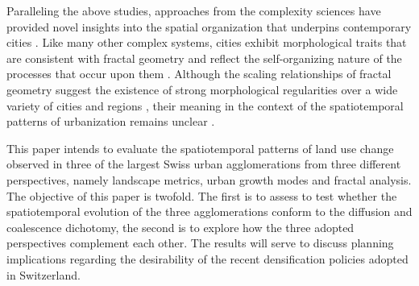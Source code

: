 \documentclass[10pt,letterpaper]{article}
\begin{document}
Paralleling the above studies, approaches from the complexity sciences have provided novel insights into the spatial organization that underpins contemporary cities \cite{batty2005cities}.
Like many other complex systems, cities exhibit morphological traits that are consistent with fractal geometry and reflect the self-organizing nature of the processes that occur upon them \cite{white1993cellular}.
Although the scaling relationships of fractal geometry suggest the existence of strong morphological regularities over a wide variety of cities and regions \cite{frankhauser1994fractalite, batty1994fractal, white2015modeling}, %
their meaning in the context of the spatiotemporal patterns of urbanization remains unclear \cite{li2000fractal, manson2006complexity, bosch2019addressing}.


This paper intends to evaluate the spatiotemporal patterns of land use change observed in three of the largest Swiss urban agglomerations from three different perspectives, namely landscape metrics, urban growth modes and fractal analysis. 
The objective of this paper is twofold.
The first is to assess to test whether the spatiotemporal evolution of the three agglomerations conform to the diffusion and coalescence dichotomy, the second is to explore how the three adopted perspectives complement each other.
The results will serve to discuss planning implications regarding the desirability of the recent densification policies adopted in Switzerland.
\end{document}
